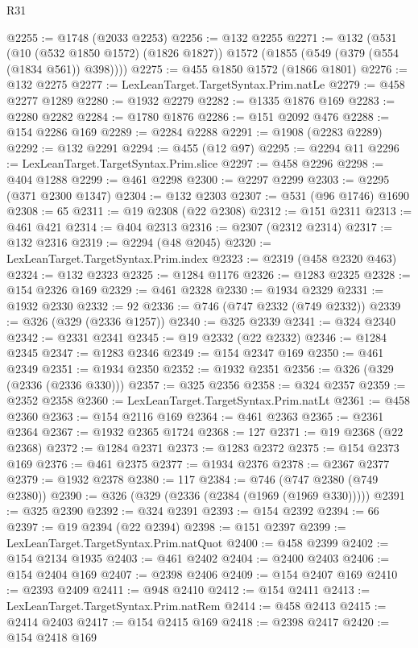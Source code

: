 \begin{lexlean}{R31}
\begin{coremodule}
@2255 := @1748 (@2033 @2253)
@2256 := @132 @2255
@2271 := @132
    (@531
      (@10 (@532 @1850 @1572) (@1826 @1827))
      @1572
      (@1855 (@549 (@379 (@554 (@1834 @561)) @398))))
@2275 := @455 @1850 @1572 (@1866 @1801)
@2276 := @132 @2275
@2277 := LexLeanTarget.TargetSyntax.Prim.natLe
@2279 := @458 @2277 @1289
@2280 := @1932 @2279
@2282 := @1335 @1876 @169
@2283 := @2280 @2282
@2284 := @1780 @1876
@2286 := @151 @2092 @476
@2288 := @154 @2286 @169
@2289 := @2284 @2288
@2291 := @1908 (@2283 @2289)
@2292 := @132 @2291
@2294 := @455 (@12 @97)
@2295 := @2294 @11
@2296 := LexLeanTarget.TargetSyntax.Prim.slice
@2297 := @458 @2296
@2298 := @404 @1288
@2299 := @461 @2298
@2300 := @2297 @2299
@2303 := @2295 (@371 @2300 @1347)
@2304 := @132 @2303
@2307 := @531 (@96 @1746) @1690
@2308 := 65
@2311 := @19 @2308 (@22 @2308)
@2312 := @151 @2311
@2313 := @461 @421
@2314 := @404 @2313
@2316 := @2307 (@2312 @2314)
@2317 := @132 @2316
@2319 := @2294 (@48 @2045)
@2320 := LexLeanTarget.TargetSyntax.Prim.index
@2323 := @2319 (@458 @2320 @463)
@2324 := @132 @2323
@2325 := @1284 @1176
@2326 := @1283 @2325
@2328 := @154 @2326 @169
@2329 := @461 @2328
@2330 := @1934 @2329
@2331 := @1932 @2330
@2332 := 92
@2336 := @746 (@747 @2332 (@749 @2332))
@2339 := @326 (@329 (@2336 @1257))
@2340 := @325 @2339
@2341 := @324 @2340
@2342 := @2331 @2341
@2345 := @19 @2332 (@22 @2332)
@2346 := @1284 @2345
@2347 := @1283 @2346
@2349 := @154 @2347 @169
@2350 := @461 @2349
@2351 := @1934 @2350
@2352 := @1932 @2351
@2356 := @326 (@329 (@2336 (@2336 @330)))
@2357 := @325 @2356
@2358 := @324 @2357
@2359 := @2352 @2358
@2360 := LexLeanTarget.TargetSyntax.Prim.natLt
@2361 := @458 @2360
@2363 := @154 @2116 @169
@2364 := @461 @2363
@2365 := @2361 @2364
@2367 := @1932 @2365 @1724
@2368 := 127
@2371 := @19 @2368 (@22 @2368)
@2372 := @1284 @2371
@2373 := @1283 @2372
@2375 := @154 @2373 @169
@2376 := @461 @2375
@2377 := @1934 @2376
@2378 := @2367 @2377
@2379 := @1932 @2378
@2380 := 117
@2384 := @746 (@747 @2380 (@749 @2380))
@2390 := @326 (@329 (@2336 (@2384 (@1969 (@1969 @330)))))
@2391 := @325 @2390
@2392 := @324 @2391
@2393 := @154 @2392
@2394 := 66
@2397 := @19 @2394 (@22 @2394)
@2398 := @151 @2397
@2399 := LexLeanTarget.TargetSyntax.Prim.natQuot
@2400 := @458 @2399
@2402 := @154 @2134 @1935
@2403 := @461 @2402
@2404 := @2400 @2403
@2406 := @154 @2404 @169
@2407 := @2398 @2406
@2409 := @154 @2407 @169
@2410 := @2393 @2409
@2411 := @948 @2410
@2412 := @154 @2411
@2413 := LexLeanTarget.TargetSyntax.Prim.natRem
@2414 := @458 @2413
@2415 := @2414 @2403
@2417 := @154 @2415 @169
@2418 := @2398 @2417
@2420 := @154 @2418 @169

\end{coremodule}
\end{lexlean}
